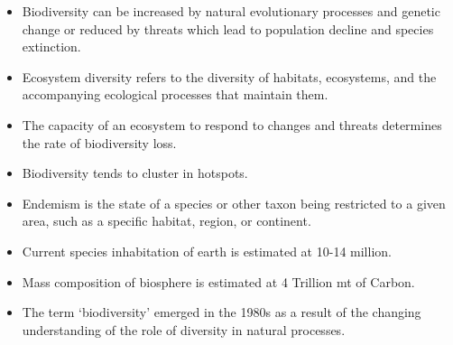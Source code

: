 \documentclass[
  ignorenonframetext,
  aspectratio=169]{beamer}
\providecommand{\tightlist}{%
  \setlength{\itemsep}{0pt}\setlength{\parskip}{0pt}}
\begin{document}
\begin{frame}{}
\protect\hypertarget{section-2}{}
\begin{itemize}
\tightlist
\item
  Biodiversity can be increased by natural evolutionary processes and
  genetic change or reduced by threats which lead to population decline
  and species extinction.
\item
  Ecosystem diversity refers to the diversity of habitats, ecosystems,
  and the accompanying ecological processes that maintain them.
\item
  The capacity of an ecosystem to respond to changes and threats
  determines the rate of biodiversity loss.
\item
  Biodiversity tends to cluster in hotspots.
\item
  Endemism is the state of a species or other taxon being restricted to
  a given area, such as a specific habitat, region, or continent.
\item
  Current species inhabitation of earth is estimated at 10-14 million.
\item
  Mass composition of biosphere is estimated at 4 Trillion mt of Carbon.
\item
  The term `biodiversity' emerged in the 1980s as a result of the
  changing understanding of the role of diversity in natural processes.
\end{itemize}
\end{frame}
\end{document}

